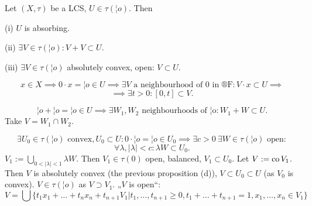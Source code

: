\documentclass[12pt]{article}					%
\begin{document}
\begin{tvrzeni}
	Let $(X, τ)$ be a LCS, $U \in τ(¦o)$. Then
	
	(i) $U$ is absorbing.

	(ii) $\exists V \in τ(¦o): V + V \subset U$.

	(iii) $\exists V \in τ(¦o)$ absolutely convex, open: $V \subset U$.

	\begin{dukazin}[i]
		$$ x \in X \implies 0·x = ¦o \in U \implies \exists V \text{ a neighbourhood of $0$ in ®F}: V·x \subset U \implies $$
		$$ \implies \exists t > 0: [0, t] \subset V. $$
	\end{dukazin}

	\begin{dukazin}[ii]
		$$ ¦o + ¦o = ¦o \in U \implies \exists W_1, W_2 \text{ neighbourhoods of ¦o}: W_1 + W \subset U. $$
		Take $V = W_1 \cap W_2$.
	\end{dukazin}

	\begin{dukazin}
		$$ \exists U_0 \in τ(¦o) \text{ convex}, U_0 \subset U: 0·¦o = ¦o \in U_0 \implies \exists c > 0\ \exists W \in τ(¦o) \text{ open}: $$
		$$ \forall λ, |λ| < c: λW \subset U_0. $$
		$V_1 := \bigcup_{0 < |λ| < 1} λW$. Then $V_1 \in τ(0)$ open, balanced, $V_1 \subset U_0$. Let $V := \operatorname{co} V_1$. Then $V$ is absolutely convex (the previous proposition (d)), $V \subset U_0 \subset U$ (as $V_0$ is convex). $V \in τ(¦o)$ as $V \supset V_1$. „$V$ is open“:
		$$ V = \bigcup\{t_1x_1 + … + t_nx_n + t_{n+1}V_1 | t_1, …, t_{n+1} ≥ 0, t_1 + … + t_{n+1} = 1, x_1, …, x_n \in V_1\} $$
	\end{dukazin}
\end{tvrzeni}

\end{document}
